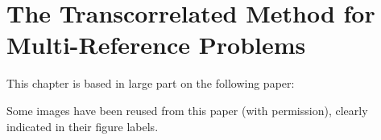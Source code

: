 \chapter{The Transcorrelated Method for Multi-Reference Problems}
  \label{chap:binding}

This chapter is based in large part on the following paper:\\

Some images have been reused from this paper (with permission), clearly indicated in their figure labels.
